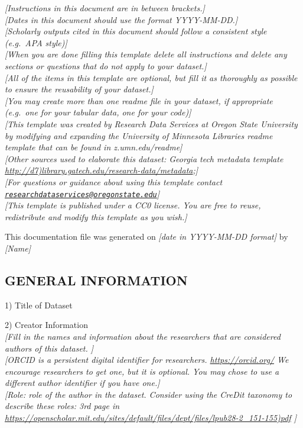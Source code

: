 \documentclass[]{article}
\date{}
\begin{document}
\emph{{[}Instructions in this document are in between brackets.{]}}\\
\emph{{[}Dates in this document should use the format YYYY-MM-DD.{]}}\\
\emph{{[}Scholarly outputs cited in this document should follow a
consistent style (e.g.~APA style){]}}\\
\emph{{[}When you are done filling this template delete all instructions
and delete any sections or questions that do not apply to your
dataset.{]}}\\
\emph{{[}All of the items in this template are optional, but fill it as
thoroughly as possible to ensure the reusability of your dataset.{]}}\\
\emph{{[}You may create more than one readme file in your dataset, if
appropriate (e.g.~one for your tabular data, one for your code){]}}\\
\emph{{[}This template was created by Research Data Services at Oregon
State University by modifying and expanding the University of Minnesota
Libraries readme template that can be found in z.umn.edu/readme{]}}\\
\emph{{[}Other sources used to elaborate this dataset: Georgia tech
metadata template
\url{http://d7)library.gatech.edu/research-data/metadata};{]}}\\
\emph{{[}For questions or guidance about using this template contact
\href{mailto:researchdataservices@oregonstate.edu}{\nolinkurl{researchdataservices@oregonstate.edu}}{]}}\\
\emph{{[}This template is published under a CC0 license. You are free to
reuse, redistribute and modify this template as you wish.{]}}

This documentation file was generated on \emph{{[}date in YYYY-MM-DD
format{]}} by \emph{{[}Name{]}}

\subsection{GENERAL INFORMATION}\label{general-information}

1) Title of Dataset

2) Creator Information\\
\emph{{[}Fill in the names and information about the researchers that
are considered authors of this dataset. {]}}\\
\emph{{[}ORCID is a persistent digital identifier for researchers.
\url{https://orcid.org/} We encourage researchers to get one, but it is
optional. You may chose to use a different author identifier if you have
one.{]}}\\
\emph{{[}Role: role of the author in the dataset. Consider using the
CreDit taxonomy to describe these roles: 3rd page in
\url{https://openscholar.mit.edu/sites/default/files/dept/files/lpub28-2_151-155)pdf}
{]}}
\end{document}
